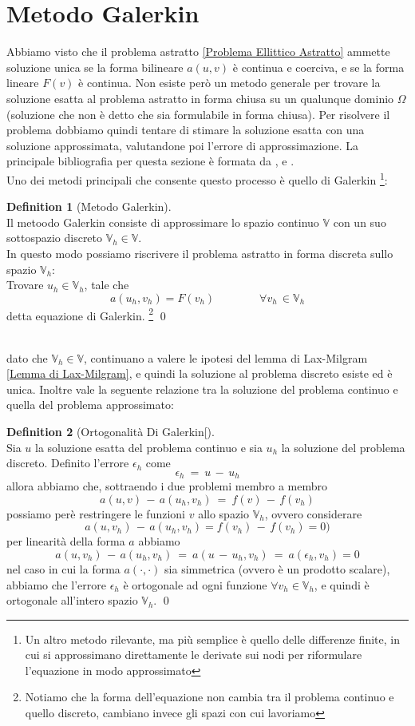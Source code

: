 \documentclass[12pt,a4paper]{report}
\theoremstyle{theorem}
\theoremstyle{definition}
\newtheorem{definition}{Definition}[section]
\begin{document}
\section{Metodo Galerkin}
Abbiamo visto che il problema astratto \ref{Problema Ellittico Astratto} ammette soluzione unica se la forma bilineare $a(u,v)$ è continua e coerciva, e se la forma lineare $F(v)$ è continua. Non esiste però un metodo generale per trovare la soluzione esatta al problema astratto in forma chiusa su un qualunque dominio $\Omega$ (soluzione che non è detto che sia formulabile in forma chiusa). Per risolvere il problema dobbiamo quindi tentare di stimare la soluzione esatta con una soluzione approssimata, valutandone poi l'errore di approssimazione. La principale bibliografia per questa sezione è formata da \cite{BS}, \cite{Ciarlet} e \cite{Q}.\\
Uno dei metodi principali che consente questo processo è quello di Galerkin \footnote{Un altro metodo rilevante, ma più semplice è quello delle differenze finite, in cui si approssimano direttamente le derivate sui nodi per riformulare l'equazione in modo approssimato}:
\begin{definition} [Metodo Galerkin]
\hfill \\
Il metoodo Galerkin consiste di approssimare lo spazio continuo $\mathbb{V}$ con un suo sottospazio discreto $\mathbb{V}_{h} \in \mathbb{V}$.\\
In questo modo possiamo riscrivere il problema astratto in forma discreta sullo spazio $\mathbb{V}_{h}$:\\
Trovare $u_{h} \in  \mathbb{V}_{h}$, tale che
\[ a(u_{h},v_{h}) = F(v_{h}) \qquad \qquad \forall v_{h} \, \in \mathbb{V}_{h} \]
detta equazione di Galerkin. \footnote{Notiamo che la forma dell'equazione non cambia tra il problema continuo e quello discreto, cambiano invece gli spazi con cui lavoriamo}
\qed
\end{definition}
\hfill \\
dato che $\mathbb{V}_{h} \in \mathbb{V}$, continuano a valere le ipotesi del lemma di Lax-Milgram \ref{Lemma di Lax-Milgram}, e quindi la soluzione al problema discreto esiste ed è unica. Inoltre vale la seguente relazione tra la soluzione del problema continuo e quella del problema approssimato:
\begin{definition} [Ortogonalità Di Galerkin[]
\hfill \\
Sia $u$ la soluzione esatta del problema continuo e sia $u_{h}$ la soluzione del problema discreto. Definito l'errore $\epsilon_{h}$ come
\[ \epsilon_{h} \ = \ u \, - \, u_{h} \]
allora abbiamo che, sottraendo i due problemi membro a membro
\[ a(u,v) \, - \, a(u_{h}, v_{h}) \ =  \ f(v) \, - \, f(v_{h}) \]
possiamo perè restringere le funzioni $v$ allo spazio $\mathbb{V}_h$, ovvero considerare
\[ a(u,v_{h}) \, - \, a(u_{h}, v_{h}) = f(v_{h}) \, - \, f(v_{h}) = 0) \]
per linearità della forma $a$ abbiamo
\[ a(u,v_{h}) \, - \, a(u_{h}, v_{h}) \ =  \ a(u \, - \, u_{h}, v_{h}) \ =  \ a(\epsilon_{h},v_{h}) = 0 \]
nel caso in cui la forma $a(\cdot,\cdot)$ sia simmetrica (ovvero è un prodotto scalare), abbiamo che l'errore $\epsilon_{h}$ è ortogonale ad ogni funzione $\forall v_{h} \in \mathbb{V}_{h}$, e quindi è ortogonale all'intero spazio $\mathbb{V}_{h}$.
\qed
\end{definition}
\end{document}
